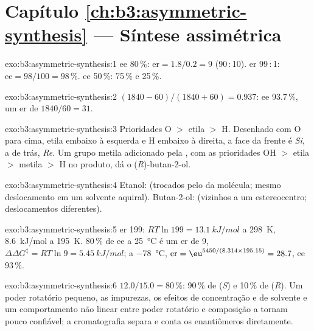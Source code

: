 \section*{Capítulo \ref{ch:b3:asymmetric-synthesis} --- Síntese assimétrica}

\begin{solution}{exo:b3:asymmetric-synthesis:1}
ee 80\,\%: $\mathrm{er} = 1.8/0.2 = 9$ (90\,:\,10). er 99\,:\,1: $\mathrm{ee} = 98/100 = 98$\,\%. ee 50\,\%: 75\,\% e 25\,\%.
\end{solution}

\begin{solution}{exo:b3:asymmetric-synthesis:2}
$(1840 - 60)/(1840 + 60) = 0.937$: ee 93.7\,\%, um er de $1840/60 = 31$.
\end{solution}

\begin{solution}{exo:b3:asymmetric-synthesis:3}
Prioridades O $>$ etila $>$ H. Desenhado com O para cima, etila embaixo à esquerda e H embaixo à direita, a
face da frente é \textit{Si}, a de trás, \textit{Re}. Um grupo metila adicionado pela , com
as prioridades OH $>$ etila $>$ metila $>$ H no produto, dá o (\textit{R})-butan-2-ol.
\end{solution}

\begin{solution}{exo:b3:asymmetric-synthesis:4}
Etanol:  (trocados pelo  da molécula; mesmo
deslocamento em um solvente aquiral). Butan-2-ol:  (vizinhos a um estereocentro;
deslocamentos diferentes).
\end{solution}

\begin{solution}{exo:b3:asymmetric-synthesis:5}
er 199: $RT\ln 199 = \qty{13.1}{kJ/mol}$ a \qty{298}{K}, \qty{8.6}{kJ/mol} a \qty{195}{K}. 80\,\% de ee a \qty{25}{\celsius} é um er de 9,
$\Delta\Delta G^\ddagger = RT\ln 9 = \qty{5.45}{kJ/mol}$; a \qty{-78}{\celsius}, $\mathrm{er} = \eu^{5450/(8.314 \times 195.15)} = 28.7$, ee 93\,\%.
\end{solution}

\begin{solution}{exo:b3:asymmetric-synthesis:6}
 $12.0/15.0 = 80$\,\%: 90\,\% de (\textit{S}) e 10\,\% de (\textit{R}). Um poder rotatório pequeno, as impurezas,
os efeitos de concentração e de solvente e um comportamento não linear entre poder rotatório e composição
a tornam pouco confiável; a cromatografia separa e conta os
enantiômeros diretamente.
\end{solution}

